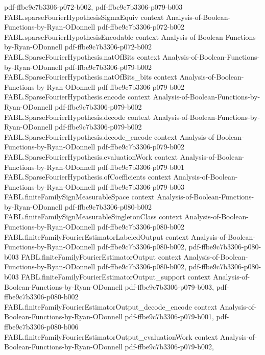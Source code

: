 \begin{theorem}
  {pdf-ffbe9c7b3306-p072-b002,
    pdf-ffbe9c7b3306-p079-b003}
\proofstep
  {FABL.sparseFourierHypothesisSigmaEquiv}
  {context}
  {Analysis-of-Boolean-Functions-by-Ryan-ODonnell}
  {pdf-ffbe9c7b3306-p072-b002}
\proofstep
  {FABL.sparseFourierHypothesisEncodable}
  {context}
  {Analysis-of-Boolean-Functions-by-Ryan-ODonnell}
  {pdf-ffbe9c7b3306-p072-b002}
\proofstep
  {FABL.SparseFourierHypothesis.natOfBits}
  {context}
  {Analysis-of-Boolean-Functions-by-Ryan-ODonnell}
  {pdf-ffbe9c7b3306-p079-b002}
\proofstep
  {FABL.SparseFourierHypothesis.natOfBits_bits}
  {context}
  {Analysis-of-Boolean-Functions-by-Ryan-ODonnell}
  {pdf-ffbe9c7b3306-p079-b002}
\proofstep
  {FABL.SparseFourierHypothesis.encode}
  {context}
  {Analysis-of-Boolean-Functions-by-Ryan-ODonnell}
  {pdf-ffbe9c7b3306-p079-b002}
\proofstep
  {FABL.SparseFourierHypothesis.decode}
  {context}
  {Analysis-of-Boolean-Functions-by-Ryan-ODonnell}
  {pdf-ffbe9c7b3306-p079-b002}
\proofstep
  {FABL.SparseFourierHypothesis.decode_encode}
  {context}
  {Analysis-of-Boolean-Functions-by-Ryan-ODonnell}
  {pdf-ffbe9c7b3306-p079-b002}
\proofstep
  {FABL.SparseFourierHypothesis.evaluationWork}
  {context}
  {Analysis-of-Boolean-Functions-by-Ryan-ODonnell}
  {pdf-ffbe9c7b3306-p079-b001}
\proofstep
  {FABL.SparseFourierHypothesis.ofCoefficients}
  {context}
  {Analysis-of-Boolean-Functions-by-Ryan-ODonnell}
  {pdf-ffbe9c7b3306-p079-b003}
\proofstep
  {FABL.finiteFamilySignMeasurableSpace}
  {context}
  {Analysis-of-Boolean-Functions-by-Ryan-ODonnell}
  {pdf-ffbe9c7b3306-p080-b002}
\proofstep
  {FABL.finiteFamilySignMeasurableSingletonClass}
  {context}
  {Analysis-of-Boolean-Functions-by-Ryan-ODonnell}
  {pdf-ffbe9c7b3306-p080-b002}
\proofstep
  {FABL.finiteFamilyFourierEstimatorLabeledOutput}
  {context}
  {Analysis-of-Boolean-Functions-by-Ryan-ODonnell}
  {pdf-ffbe9c7b3306-p080-b002,
    pdf-ffbe9c7b3306-p080-b003}
\proofstep
  {FABL.finiteFamilyFourierEstimatorOutput}
  {context}
  {Analysis-of-Boolean-Functions-by-Ryan-ODonnell}
  {pdf-ffbe9c7b3306-p080-b002,
    pdf-ffbe9c7b3306-p080-b003}
\proofstep
  {FABL.finiteFamilyFourierEstimatorOutput_support}
  {context}
  {Analysis-of-Boolean-Functions-by-Ryan-ODonnell}
  {pdf-ffbe9c7b3306-p079-b003,
    pdf-ffbe9c7b3306-p080-b002}
\proofstep
  {FABL.finiteFamilyFourierEstimatorOutput_decode_encode}
  {context}
  {Analysis-of-Boolean-Functions-by-Ryan-ODonnell}
  {pdf-ffbe9c7b3306-p079-b001,
    pdf-ffbe9c7b3306-p080-b006}
\proofstep
  {FABL.finiteFamilyFourierEstimatorOutput_evaluationWork}
  {context}
  {Analysis-of-Boolean-Functions-by-Ryan-ODonnell}
  {pdf-ffbe9c7b3306-p079-b002,
}
\end{theorem}
